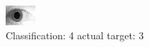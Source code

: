 \begin{figure}[h!]
\begin{center}
\includegraphics[width=0.60\columnwidth]{figures/ID1952_class_4_target_3.png}
\end{center}
\caption{ Classification: 4 actual target: 3}
\label{fig:ID1952_class_4_target_3}
\end{figure}
